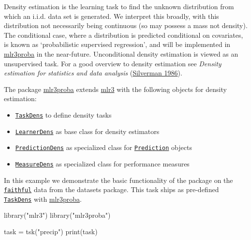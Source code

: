 \documentclass[
]{scrbook}
\newenvironment{Shaded}{\begin{snugshade}}{\end{snugshade}}
\newcommand{\FunctionTok}[1]{\textcolor[rgb]{0.00,0.00,0.00}{#1}}
\newcommand{\NormalTok}[1]{#1}
\newcommand{\OtherTok}[1]{\textcolor[rgb]{0.56,0.35,0.01}{#1}}
\newcommand{\StringTok}[1]{\textcolor[rgb]{0.31,0.60,0.02}{#1}}
\providecommand{\tightlist}{%
  \setlength{\itemsep}{0pt}\setlength{\parskip}{0pt}}
\renewenvironment{Shaded} {\begin{snugshade}\small} {\end{snugshade}}
\begin{document}
Density estimation is the learning task to find the unknown distribution from which an i.i.d. data set is generated.
We interpret this broadly, with this distribution not necessarily being continuous (so may possess a mass not density).
The conditional case, where a distribution is predicted conditional on covariates, is known as `probabilistic supervised regression', and will be implemented in \href{https://mlr3proba.mlr-org.com}{mlr3proba} in the near-future.
Unconditional density estimation is viewed as an unsupervised task.
For a good overview to density estimation see \emph{Density estimation for statistics and data analysis} (\protect\hyperlink{ref-Silverman1986}{Silverman 1986}).

The package \href{https://mlr3proba.mlr-org.com}{mlr3proba} extends \href{https://mlr3.mlr-org.com}{mlr3} with the following objects for density estimation:

\begin{itemize}
\tightlist
\item
  \href{https://mlr3proba.mlr-org.com/reference/TaskDens.html}{\texttt{TaskDens}} to define density tasks
\item
  \href{https://mlr3proba.mlr-org.com/reference/LearnerDens.html}{\texttt{LearnerDens}} as base class for density estimators
\item
  \href{https://mlr3proba.mlr-org.com/reference/PredictionDens.html}{\texttt{PredictionDens}} as specialized class for \href{https://mlr3.mlr-org.com/reference/Prediction.html}{\texttt{Prediction}} objects
\item
  \href{https://mlr3proba.mlr-org.com/reference/MeasureDens.html}{\texttt{MeasureDens}} as specialized class for performance measures
\end{itemize}

In this example we demonstrate the basic functionality of the package on the \href{https://www.rdocumentation.org/packages/datasets/topics/faithful}{\texttt{faithful}} data from the datasets package.
This task ships as pre-defined \href{https://mlr3proba.mlr-org.com/reference/TaskDens.html}{\texttt{TaskDens}} with \href{https://mlr3proba.mlr-org.com}{mlr3proba}.

\begin{Shaded}
\begin{Highlighting}[]
\FunctionTok{library}\NormalTok{(}\StringTok{"mlr3"}\NormalTok{)}
\FunctionTok{library}\NormalTok{(}\StringTok{"mlr3proba"}\NormalTok{)}

\NormalTok{task }\OtherTok{=} \FunctionTok{tsk}\NormalTok{(}\StringTok{"precip"}\NormalTok{)}
\FunctionTok{print}\NormalTok{(task)}
\end{Highlighting}
\end{Shaded}
\end{document}
